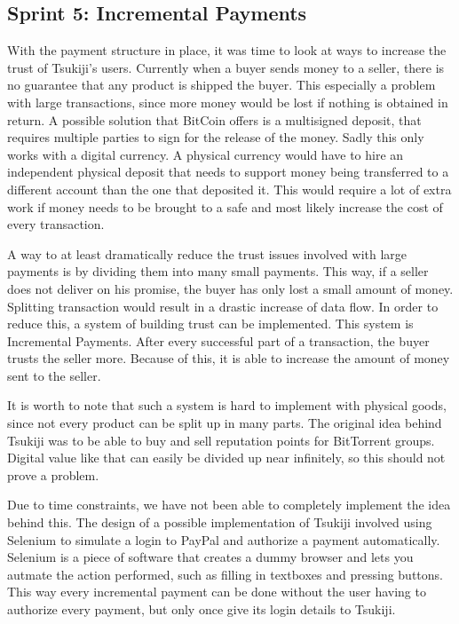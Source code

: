 \subsection{Sprint 5: Incremental Payments}
\label{incpay}
With the payment structure in place, it was time to look at ways to increase the trust of Tsukiji's users.
Currently when a buyer sends money to a seller, there is no guarantee that any product is shipped the buyer.
This especially a problem with large transactions, since more money would be lost if nothing is obtained in return.
A possible solution that BitCoin offers is a multisigned deposit, that requires multiple parties to sign for the release of the money.
Sadly this only works with a digital currency.
A physical currency would have to hire an independent physical deposit that needs to support money being transferred to a different account than the one that deposited it.
This would require a lot of extra work if money needs to be brought to a safe and most likely increase the cost of every transaction.

A way to at least dramatically reduce the trust issues involved with large payments is by dividing them into many small payments.
This way, if a seller does not deliver on his promise, the buyer has only lost a small amount of money.
Splitting transaction would result in a drastic increase of data flow. 
In order to reduce this, a system of building trust can be implemented.
This system is Incremental Payments.
After every successful part of a transaction, the buyer trusts the seller more.
Because of this, it is able to increase the amount of money sent to the seller.

It is worth to note that such a system is hard to implement with physical goods, since not every product can be split up in many parts.
The original idea behind Tsukiji was to be able to buy and sell reputation points for BitTorrent groups. Digital value like that can easily be divided up near infinitely, so this should not prove a problem.

Due to time constraints, we have not been able to completely implement the idea behind this.
The design of a possible implementation of Tsukiji involved using Selenium to simulate a login to PayPal and authorize a payment automatically.
Selenium \cite{selenium} is a piece of software that creates a dummy browser and lets you autmate the action performed, such as filling in textboxes and pressing buttons.
This way every incremental payment can be done without the user having to authorize every payment, but only once give its login details to Tsukiji.

